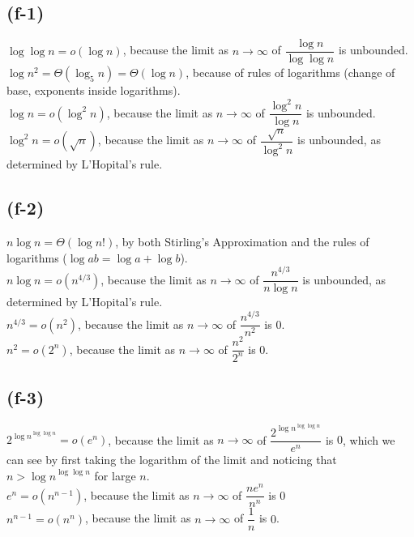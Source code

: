 \documentclass{6046}
\begin{document}
\subsection*{(f-1)}
$\log \log n = o(\log n)$, because the limit as $n
\longrightarrow \infty$ of $\dfrac{\log n}{\log \log n}$
is unbounded.\\
$\log{n^2} = \Theta(\log_5 n) = \Theta(\log n)$, because of rules of logarithms (change of base, exponents inside logarithms).\\
$\log n = o(\log^2 n)$, because the limit as $n
\longrightarrow \infty$ of $\dfrac{\log^2 n}{\log n}$
is unbounded.\\
$\log^2 n = o(\sqrt{n})$, because the limit as $n
\longrightarrow \infty$ of $\dfrac{\sqrt{n}}{\log^2 n}$
is unbounded, as determined by L'Hopital's rule.\\

\subsection*{(f-2)}
$n \log n = \Theta(\log n!)$, by both Stirling's Approximation and
the rules of logarithms ($\log ab = \log a + \log b$).\\
$n \log n = o(n^{4/3})$, because the limit as $n
\longrightarrow \infty$ of $\dfrac{n^{4/3}}{n \log n}$
is unbounded, as determined by L'Hopital's rule.\\
$n ^ {4/3} = o(n^2)$, because the limit as $n
\longrightarrow \infty$ of $\dfrac{n^ {4/3}}{n^2}$
is $0$.\\
$n ^ 2 = o(2^n)$, because the limit as $n
\longrightarrow \infty$ of $\dfrac{n^2}{2^n}$
is $0$.\\

\subsection*{(f-3)}

$2^{{\log n}^{\log \log n}} = o(e^n)$,
because the limit as $n \longrightarrow \infty$
of $\dfrac{2^{{\log n}^{\log \log n}}}{e^n}$ is $0$, which
we can see by first taking the logarithm of the limit
and noticing that $n > {\log n}^{\log \log n}$ for large $n$.\\
$e^n = o(n^{n-1})$, because the limit as $n \longrightarrow \infty$
of $\dfrac{ne^n}{n^n}$ is $0$\\
$n^{n-1} = o(n^n)$, because the limit as $n \longrightarrow \infty$
of $\dfrac{1}{n}$ is $0$.\\
\end{document}
